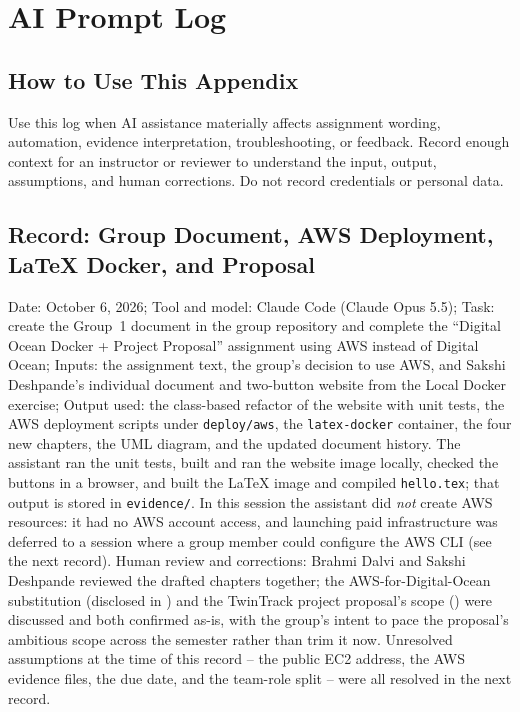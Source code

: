 \chapter{AI Prompt Log}
\section{How to Use This Appendix}
Use this log when AI assistance materially affects assignment wording,
automation, evidence interpretation, troubleshooting, or feedback. Record
enough context for an instructor or reviewer to understand the input, output,
assumptions, and human corrections. Do not record credentials or personal data.

\section{Record: Group Document, AWS Deployment, LaTeX Docker, and Proposal}
Date: October 6, 2026; Tool and model: Claude Code (Claude Opus 5.5);
Task: create the Group~1 document in the group repository and complete the
``Digital Ocean Docker + Project Proposal'' assignment using AWS instead of
Digital Ocean; Inputs: the assignment text, the group's decision to use AWS,
and Sakshi Deshpande's individual document and two-button website from the
Local Docker exercise; Output used: the class-based refactor of the website
with unit tests, the AWS deployment scripts under \texttt{deploy/aws}, the
\texttt{latex-docker} container, the four new chapters, the UML diagram, and
the updated document history. The assistant ran the unit tests, built and ran
the website image locally, checked the buttons in a browser, and built the
LaTeX image and compiled \texttt{hello.tex}; that output is stored in
\texttt{evidence/}. In this session the assistant did \emph{not} create AWS
resources: it had no AWS account access, and launching paid infrastructure was
deferred to a session where a group member could configure the AWS CLI (see
the next record). Human review and corrections: Brahmi Dalvi and Sakshi
Deshpande reviewed the drafted chapters together; the AWS-for-Digital-Ocean
substitution (disclosed in ) and the
TwinTrack project proposal's scope () were
discussed and both confirmed as-is, with the group's intent to pace the
proposal's ambitious scope across the semester rather than trim it now.
Unresolved assumptions at the time of this record -- the public EC2 address,
the AWS evidence files, the due date, and the team-role split -- were all
resolved in the next record.

